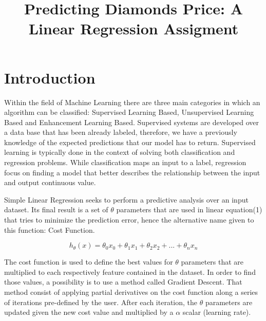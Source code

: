 \documentclass[conference]{IEEEtran}
\begin{document}
\title{Predicting Diamonds Price: A Linear Regression Assigment}

\author{
\and
{}
}

\maketitle

\section{Introduction}

	Within the field of Machine Learning there are three main categories in which an algorithm can be classified: Supervised Learning Based, Unsupervised Learning Based and Enhancement Learning Based. Supervised systems are developed over a data base that has been already labeled, therefore, we have a previously knowledge of the expected predictions that our model has to return. Supervised learning is typically done in the context of solving both classification and regression problems.
While classification maps an input to a label, regression focus on finding a model that better describes the relationship between the input and output continuous value.\par

	Simple Linear Regression seeks to perform a predictive analysis over an input dataset. Its final result is a set of $\theta$ parameters that are used in linear equation(1) that tries to minimize the prediction error, hence the alternative name given to this function: Cost Function.

\begin{equation}
h_\theta(x)= \theta_0 x_0 + \theta_1 x_1 + \theta_2 x_2 + ... + \theta_n x_n
\end{equation}

The cost function is used to define the best values for $\theta$ parameters that are multiplied to each respectively feature contained in the dataset. In order to find those values, a possibility is to use a method called Gradient Descent. That method consist of applying partial derivatives on the cost function along a series of iterations pre-defined by the user. After each iteration, the $\theta$ parameters are updated given the new cost value and multiplied by a $\alpha$ scalar (learning rate).
\end{document}

